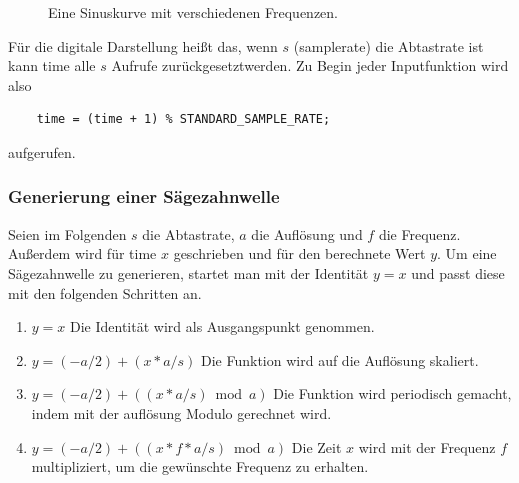 \begin{figure}[h]

    \caption{Eine Sinuskurve mit verschiedenen Frequenzen.}
    \label{fig:waveforms_with_different_frequenzys}

\end{figure}

Für die digitale Darstellung heißt das, wenn $s$ (samplerate) die Abtastrate ist
kann time alle $s$ Aufrufe zurückgesetztwerden. 
Zu Begin jeder Inputfunktion wird also 
\begin{lstlisting}
    time = (time + 1) % STANDARD_SAMPLE_RATE; 
\end{lstlisting}
aufgerufen.

\subsubsection{Generierung einer Sägezahnwelle}

Seien im Folgenden $s$ die Abtastrate, $a$ die Auflösung und $f$ 
die Frequenz. Außerdem wird für time $x$ geschrieben und für den 
berechnete Wert $y$.
Um eine Sägezahnwelle zu generieren, startet man mit der Identität
$y=x$
und passt diese mit den folgenden Schritten an.

\begin{enumerate}
    \item $y=x$ Die Identität wird als Ausgangspunkt genommen.
    \item $y=(-a/2)+(x*a/s)$ Die Funktion wird auf die Auflösung skaliert.
    \item $y=(-a/2)+((x*a/s) \bmod a)$ Die Funktion wird periodisch gemacht, indem mit der auflösung Modulo gerechnet wird.
    \item $y=(-a/2)+((x*f*a/s) \bmod a)$ Die Zeit $x$ wird mit der Frequenz $f$ multipliziert, um die gewünschte Frequenz zu erhalten.
\end{enumerate}

